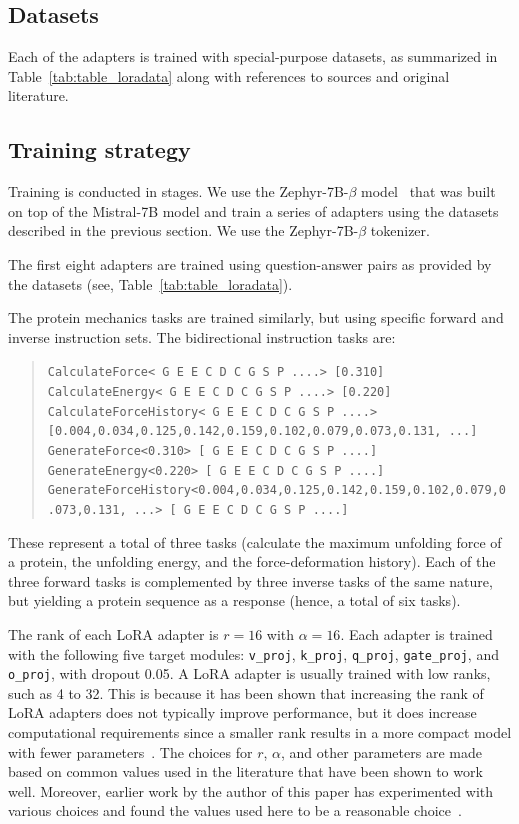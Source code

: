 \subsection{Datasets}

Each of the adapters is trained with special-purpose datasets, as summarized in Table~\ref{tab:table_loradata} along with references to sources and original literature. 



 
\subsection{Training strategy}
Training is conducted in stages. We use the  Zephyr-7B-$\beta$ model~\cite{HuggingFaceH4/zephyr-7b-betaFace} that was built on top of the Mistral-7B model\cite{Jiang2023Mistral7B} and train a series of adapters using the datasets described in the previous section. We use the Zephyr-7B-$\beta$ tokenizer. 

The first eight adapters are trained using question-answer pairs as provided by the datasets (see, Table~\ref{tab:table_loradata}). 

The protein mechanics tasks are trained similarly, but using specific forward and inverse instruction sets. The bidirectional instruction tasks are:
\begin{quote}
\tiny {\texttt{CalculateForce< G E E C D C G S P ....> [0.310]\\
CalculateEnergy< G E E C D C G S P ....> [0.220]\\ 
CalculateForceHistory< G E E C D C G S P ....> [0.004,0.034,0.125,0.142,0.159,0.102,0.079,0.073,0.131, ...]\\
GenerateForce<0.310>\,[ G E E C D C G S P ....]\\
GenerateEnergy<0.220>\,[ G E E C D C G S P ....]\\
GenerateForceHistory<0.004,0.034,0.125,0.142,0.159,0.102,0.079,0.073,0.131, ...>\,[ G E E C D C G S P ....]
}}
\end{quote}
These represent a total of three tasks (calculate the maximum unfolding force of a protein, the unfolding energy, and the force-deformation history). Each of the three forward tasks is complemented by three inverse tasks of the same nature, but yielding a protein sequence as a response (hence, a total of six tasks).  

The rank of each LoRA adapter is $r=16$ with $\alpha=16$. Each adapter is trained with the following five target  modules: \texttt{v\_proj}, \texttt{k\_proj}, \texttt{q\_proj},  \texttt{gate\_proj}, and \texttt{o\_proj}, with dropout 0.05. A LoRA adapter is usually trained with low ranks, such as 4 to 32. This is because it has been shown that increasing the rank of LoRA adapters does not typically improve performance, but it does increase computational requirements since a smaller rank results in a more compact model with fewer parameters~\cite{hu2021lora}. The choices for $r$, $\alpha$, and other parameters are made based on common values used in the literature that have been shown to work well. Moreover, earlier work by the author of this paper has experimented with various choices and found the values used here to be a reasonable choice~\cite{Luu2023BioinspiredLLM:Materials}. 


